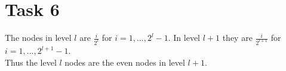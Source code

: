 \documentclass[a4paper,10pt]{article}
\title{}
\author{}
\begin{document}
\section*{Task 6}

The nodes in level $l$ are $\frac{i}{2^l}$ for $i=1,...,2^l-1$.
In level $l + 1$ they are $\frac{i}{2^{l+1}}$ for $i=1,...,2^{l+1}-1$.\\
Thus the level $l$ nodes are the even nodes in level $l+1$.
\end{document}
